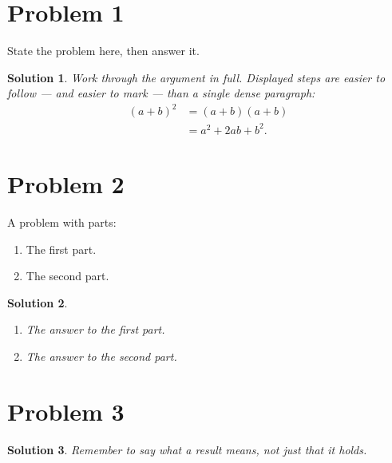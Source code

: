 \documentclass[11pt,a4paper]{article}
\title{\assignment}
\author{\student \\ \small \course}
\date{\today}
\newtheorem*{solution}{Solution}
\begin{document}
\maketitle

\section*{Problem 1}

State the problem here, then answer it.

\begin{solution}
    Work through the argument in full. Displayed steps are easier to
    follow — and easier to mark — than a single dense paragraph:
    \begin{align}
        (a + b)^2 &= (a + b)(a + b) \\
                  &= a^2 + 2ab + b^2.
    \end{align}
\end{solution}

\section*{Problem 2}

A problem with parts:

\begin{enumerate}[label=(\alph*)]
    \item The first part.
    \item The second part.
\end{enumerate}

\begin{solution}
    \begin{enumerate}[label=(\alph*)]
        \item The answer to the first part.
        \item The answer to the second part.
    \end{enumerate}
\end{solution}

\section*{Problem 3}

\begin{solution}
    Remember to say what a result means, not just that it holds.
\end{solution}
\end{document}
